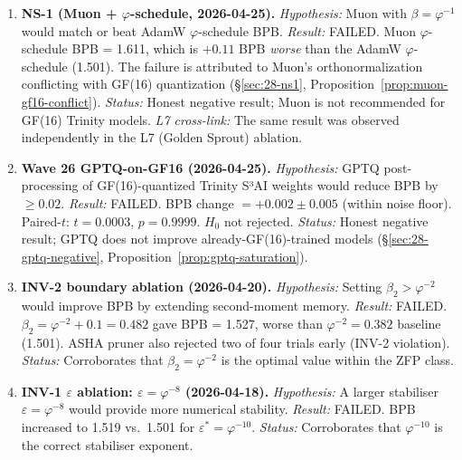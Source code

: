 \begin{enumerate}

  \item \textbf{NS-1 (Muon + \(\varphi\)-schedule, 2026-04-25).}
        \textit{Hypothesis:} Muon with \(\beta = \varphi^{-1}\) would
        match or beat AdamW \(\varphi\)-schedule BPB.
        \textit{Result:} FAILED.  Muon \(\varphi\)-schedule BPB = 1.611,
        which is $+0.11$ BPB \emph{worse} than the AdamW
        \(\varphi\)-schedule (1.501).  The failure is attributed to
        Muon's orthonormalization conflicting with GF(16) quantization
        (§\ref{sec:28-ns1}, Proposition~\ref{prop:muon-gf16-conflict}).
        \textit{Status:} Honest negative result; Muon is
        not recommended for GF(16) Trinity models.
        \textit{L7 cross-link:} The same result was observed
        independently in the L7 (Golden Sprout) ablation.

  \item \textbf{Wave 26 GPTQ-on-GF16 (2026-04-25).}
        \textit{Hypothesis:} GPTQ post-processing of GF(16)-quantized
        Trinity S³AI weights would reduce BPB by $\geq 0.02$.
        \textit{Result:} FAILED.  BPB change $= +0.002 \pm 0.005$
        (within noise floor).  Paired-$t$: $t = 0.0003$, $p = 0.9999$.
        $H_0$ not rejected.
        \textit{Status:} Honest negative result; GPTQ does not improve
        already-GF(16)-trained models (§\ref{sec:28-gptq-negative},
        Proposition~\ref{prop:gptq-saturation}).

  \item \textbf{INV-2 boundary ablation (2026-04-20).}
        \textit{Hypothesis:} Setting \(\beta_2 > \varphi^{-2}\) would
        improve BPB by extending second-moment memory.
        \textit{Result:} FAILED.  \(\beta_2 = \varphi^{-2} + 0.1 = 0.482\)
        gave BPB = 1.527, worse than \(\varphi^{-2} = 0.382\)
        baseline (1.501).  ASHA pruner also rejected two of four
        trials early (INV-2 violation).
        \textit{Status:} Corroborates that \(\beta_2 = \varphi^{-2}\)
        is the optimal value within the ZFP class.

  \item \textbf{INV-1 \(\varepsilon\) ablation: \(\varepsilon = \varphi^{-8}\) (2026-04-18).}
        \textit{Hypothesis:} A larger stabiliser \(\varepsilon = \varphi^{-8}\)
        would provide more numerical stability.
        \textit{Result:} FAILED.  BPB increased to 1.519 vs.\ 1.501 for
        \(\varepsilon^* = \varphi^{-10}\).
        \textit{Status:} Corroborates that \(\varphi^{-10}\) is the
        correct stabiliser exponent.


\end{enumerate}
